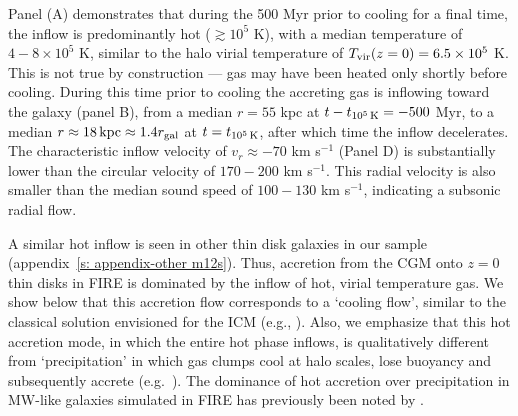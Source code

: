 \documentclass[fleqn,usenatbib]{mnras}
\newcommand{\tcools}{t_{10^5\,{\rm K}}}
\newcommand{\Tvir}{T_{\rm vir}}
\begin{document}
Panel (A) demonstrates that during the 500 Myr prior to cooling for a final time, the inflow is predominantly hot ($\gtrsim 10^5$ K), with a median temperature of $4-8\times10^5$ K, similar to the halo virial temperature of $\Tvir(z=0)=6.5\times10^5$ K.
This is not true by construction --- gas may have been heated only shortly before cooling.
During this time prior to cooling the accreting gas is inflowing toward the galaxy (panel B), from a median $r=55$ kpc at $t-\tcools=-500$ Myr, to a median $r\approx18\,{\rm kpc}\approx1.4 r_{\rm gal}$ at $t=\tcools$, after which time the inflow decelerates.
The characteristic inflow velocity of $v_r \approx-70$ km s$^{-1}$ (Panel D) is substantially lower than the circular velocity of $170-200$ km s$^{-1}$.
This radial velocity is also smaller than the median sound speed of $100-130$ km s$^{-1}$, indicating a subsonic radial flow. 


A similar hot inflow is seen in other thin disk galaxies in our sample (appendix~\ref{s: appendix-other m12s}).
Thus, accretion from the CGM onto $z=0$ thin disks in FIRE is dominated by the inflow of hot, virial temperature gas.
We show below that this accretion flow corresponds to a `cooling flow', similar to the classical solution envisioned for the ICM (e.g., \citealt{Mathews1978}).
Also, we emphasize that this hot accretion mode, in which the entire hot phase inflows, is qualitatively different from `precipitation' in which gas clumps cool at halo scales, lose buoyancy and subsequently accrete (e.g.~\citealt{Maller2004,Voit2017}). The dominance of hot accretion over precipitation in MW-like galaxies simulated in FIRE has previously been noted by \cite{Esmerian2021}. 
\end{document}
